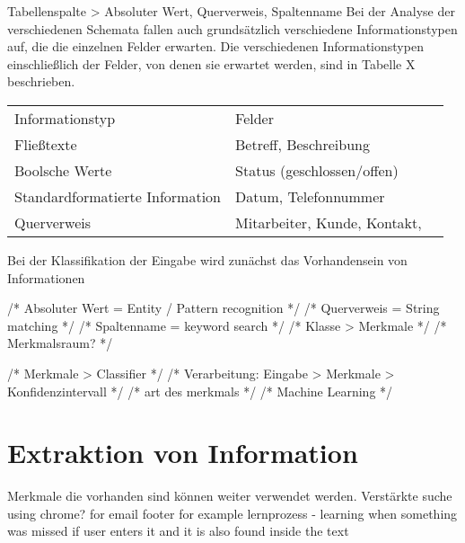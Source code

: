 Tabellenspalte > Absoluter Wert, Querverweis, Spaltenname
Bei der Analyse der verschiedenen Schemata fallen auch grundsätzlich verschiedene Informationstypen auf, die die einzelnen Felder erwarten. Die verschiedenen Informationstypen einschließlich der Felder, von denen sie erwartet werden, sind in Tabelle X beschrieben.

\begin{tabular}{lll}
    Informationstyp                 & Felder \\
    Fließtexte                      & Betreff, Beschreibung \\
    Boolsche Werte                  & Status (geschlossen/offen) \\
    Standardformatierte Information & Datum, Telefonnummer \\
    Querverweis                     & Mitarbeiter, Kunde, Kontakt, \\
\end{tabular}

Bei der Klassifikation der Eingabe wird zunächst das Vorhandensein von Informationen




/* Absoluter Wert = Entity / Pattern recognition */
/* Querverweis = String matching */
/* Spaltenname = keyword search */
/* Klasse > Merkmale */
/* Merkmalsraum? */

/* Merkmale > Classifier */
/* Verarbeitung: Eingabe > Merkmale > Konfidenzintervall */
/* art des merkmals */ 
/* Machine Learning */

\section{Extraktion von Information}
Merkmale die vorhanden sind können weiter verwendet werden.
Verstärkte suche
using chrome? for email footer for example
lernprozess - learning when something was missed if user enters it and it is also found inside the text
